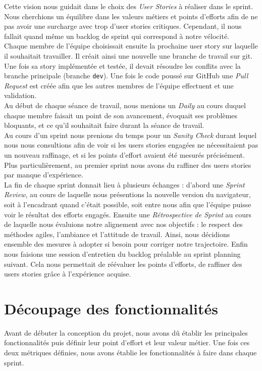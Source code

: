 \documentclass[10pt,a4paper]{article}
\begin{document}
Cette vision nous guidait dans le choix des \textit{User Stories} à réaliser dans le sprint. Nous cherchions un équilibre dans les valeurs métiers et points d’efforts afin de ne pas avoir une surcharge avec trop d’user stories critiques. Cependant, il nous fallait quand même un backlog de sprint qui correspond à notre vélocité. \\

Chaque membre de l’équipe choisissait ensuite la prochaine user story sur laquelle il souhaitait travailler. Il créait ainsi une nouvelle une branche de travail sur git. Une fois sa story implémentée et testée, il devait résoudre les conflits avec la branche principale (branche \verb|dev|). Une fois le code poussé sur GitHub une \textit{Pull Request} est créée afin que les autres membres de l'équipe effectuent et une validation. \\

Au début de chaque séance de travail, nous menions un \textit{Daily} au cours duquel chaque membre faisait un point de son avancement, évoquait ses problèmes bloquants, et ce qu'il souhaitait faire durant la séance de travail. \\
 
Au cours d’un sprint nous prenions du temps pour un \textit{Sanity Check} durant lequel nous nous consultions afin de voir si les users stories engagées ne nécessitaient pas un nouveau raffinage, et si les points d’effort avaient été mesurés précisément. Plus particulièrement, au premier sprint nous avons du raffiner des users stories par manque d’expérience. \\

La fin de chaque sprint donnait lieu à plusieurs échanges : d’abord une \textit{Sprint Review}, au cours de laquelle nous présentions la nouvelle version du navigateur, soit à l'encadrant quand c’était possible, soit entre nous afin que l’équipe puisse voir le résultat des efforts engagés. Ensuite une \textit{Rétrospective de Sprint} au cours de laquelle nous évaluions notre alignement avec nos objectifs : le respect des méthodes agiles, l’ambiance et l’attitude de travail. Ainsi, nous décidions ensemble des mesures à adopter si besoin pour corriger notre trajectoire. Enfin nous faisions une session d’entretien du backlog préalable au sprint planning suivant. Cela nous permettait de réévaluer les points d’efforts, de raffiner des users stories grâce à l’expérience acquise.


\newpage

\section{Découpage des fonctionnalités}
Avant de débuter la conception du projet, nous avons dû établir les principales fonctionnalités puis définir leur point d'effort et leur valeur métier. Une fois ces deux métriques définies, nous avons établie les fonctionnalités à faire dans chaque sprint. 
\end{document}
